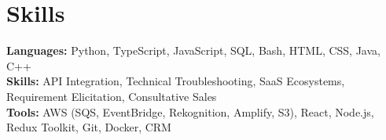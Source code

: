 \documentclass[11pt]{article}       %
\begin{document}

\vspace{-18.5pt}


\section*{Skills}
\textbf{Languages:} Python, TypeScript, JavaScript, SQL, Bash, HTML, CSS, Java, C++\\
\textbf{Skills:} API Integration, Technical Troubleshooting, SaaS Ecosystems, Requirement Elicitation, Consultative Sales\\
\textbf{Tools:} AWS (SQS, EventBridge, Rekognition, Amplify, S3), React, Node.js, Redux Toolkit, Git, Docker, CRM\\

\vspace{-6.5pt}
\end{document}
